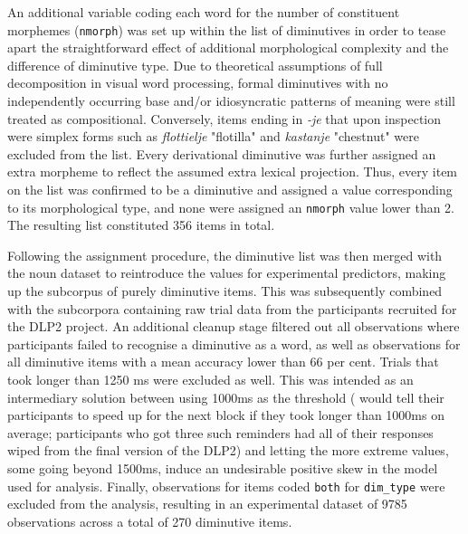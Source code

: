 An additional variable coding each word for the number of constituent morphemes (\texttt{nmorph}) was set up within the list of diminutives in order to tease apart the straightforward effect of additional morphological complexity and the difference of diminutive type. Due to theoretical assumptions of full decomposition in visual word processing, formal diminutives with no independently occurring base and/or idiosyncratic patterns of meaning were still treated as compositional. Conversely, items ending in \textit{-je} that upon inspection were simplex forms such as \textit{flottielje} "flotilla" and \textit{kastanje} "chestnut" were excluded from the list. Every derivational diminutive was further assigned an extra morpheme to reflect the assumed extra lexical projection. Thus, every item on the list was confirmed to be a diminutive and assigned a value corresponding to its morphological type, and none were assigned an \texttt{nmorph} value lower than 2. The resulting list constituted 356 items in total.

Following the assignment procedure, the diminutive list was then merged with the noun dataset to reintroduce the values for experimental predictors, making up the subcorpus of purely diminutive items. This was subsequently combined with the subcorpora containing raw trial data from the participants recruited for the DLP2 project. An additional cleanup stage filtered out all observations where participants failed to recognise a diminutive as a word, as well as observations for all diminutive items with a mean accuracy lower than 66 per cent. Trials that took longer than 1250 ms were excluded as well. This was intended as an intermediary solution between using 1000ms as the threshold (\cite{Brysbaert+etal+2016} would tell their participants to speed up for the next block if they took longer than 1000ms on average; participants who got three such reminders had all of their responses wiped from the final version of the DLP2) and letting the more extreme values, some going beyond 1500ms, induce an undesirable positive skew in the model used for analysis. Finally, observations for items coded \texttt{both} for \texttt{dim\_type} were excluded from the analysis, resulting in an experimental dataset of 9785 observations across a total of 270 diminutive items.

